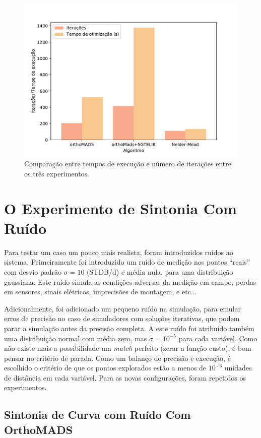 \begin{figure}
\centering
  \includegraphics[width=0.7\linewidth]{figs/comp_time_iter.pdf}
  \caption{Comparação entre tempos de execução e número de iterações entre os três experimentos.}
  \label{fig:comp1}
\end{figure}


\chapter{O Experimento de Sintonia Com Ruído}

Para testar um caso um pouco mais realista, foram introduzidos ruídos ao sistema.
%
Primeiramente foi introduzido um ruído de medição nos pontos ``reais'' com desvio padrão $\sigma = 10$ (STDB/d) e média nula, para uma distribuição gaussiana.
%
Este ruído simula as condições adversas da medição em campo, perdas em sensores, sinais elétricos, imprecisões de montagem, e etc...
%
%

Adicionalmente, foi adicionado um pequeno ruído na simulação, para emular erros de precisão no caso de simuladores com soluções iterativas, que podem parar a simulação antes da precisão completa. 
%
A este ruído foi atribuído também uma distribuição normal com média zero, mas $\sigma = 10^{-5}$ para cada variável.
%
Como não existe mais a possibilidade um \textit{match} perfeito (zerar a função custo), é bom pensar no critério de parada. 
%
Como um balanço de precisão e execução, é escolhido o critério de que os pontos explorados estão a menos de $10^{-3}$ unidades de distância em cada variável.
%
Para as novas configurações, foram repetidos os experimentos.



\section{Sintonia de Curva com Ruído Com OrthoMADS}

